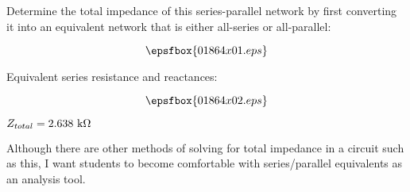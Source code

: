 

Determine the total impedance of this series-parallel network by first converting it into an equivalent network that is either all-series or all-parallel:

$$\epsfbox{01864x01.eps}$$







Equivalent series resistance and reactances:

$$\epsfbox{01864x02.eps}$$

$Z_{total} = 2.638 \hbox{ k}\Omega$







Although there are other methods of solving for total impedance in a circuit such as this, I want students to become comfortable with series/parallel equivalents as an analysis tool.




